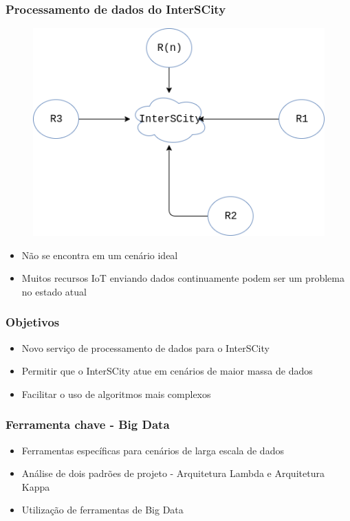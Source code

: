 \documentclass{beamer}
\begin{document}
    \begin{frame}
        \frametitle{Processamento de dados do InterSCity}
        \begin{figure}
            \includegraphics[scale=0.4]{figures/iot_resources.png}
        \end{figure}
        \begin{itemize}
            \item Não se encontra em um cenário ideal
            \item Muitos recursos IoT enviando dados continuamente podem ser um
                problema no estado atual
        \end{itemize}
    \end{frame}

    \begin{frame}
        \frametitle{Objetivos}
        \begin{itemize}
            \item Novo serviço de processamento de dados para o InterSCity
            \item Permitir que o InterSCity atue em cenários de maior massa de dados
            \item Facilitar o uso de algoritmos mais complexos
        \end{itemize}
    \end{frame}

    \begin{frame}
        \frametitle{Ferramenta chave - Big Data}
        \begin{itemize}
            \item Ferramentas específicas para cenários de larga escala de dados
            \item Análise de dois padrões de projeto - Arquitetura Lambda e Arquitetura Kappa
            \item Utilização de ferramentas de Big Data
        \end{itemize}
    \end{frame}
\end{document}
